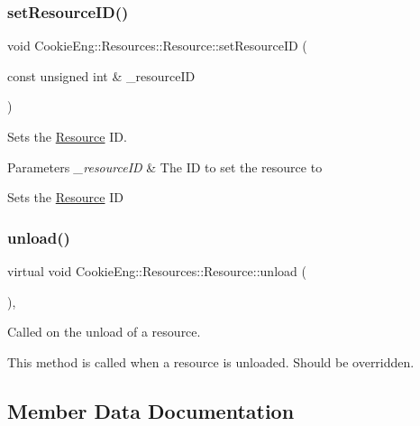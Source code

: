 \subsubsection{\texorpdfstring{set\+Resource\+I\+D()}{setResourceID()}}
{\footnotesize\ttfamily void Cookie\+Eng\+::\+Resources\+::\+Resource\+::set\+Resource\+ID (\begin{DoxyParamCaption}\item[{const unsigned int \&}]{\+\_\+resource\+ID }\end{DoxyParamCaption})\hspace{0.3cm}{\ttfamily [inline]}}



Sets the \hyperlink{class_cookie_eng_1_1_resources_1_1_resource}{Resource} ID. 


\begin{DoxyParams}{Parameters}
{\em \+\_\+resource\+ID} & The ID to set the resource to\\
\hline
\end{DoxyParams}
Sets the \hyperlink{class_cookie_eng_1_1_resources_1_1_resource}{Resource} ID \mbox{\label{class_cookie_eng_1_1_resources_1_1_resource_acfe5141c546d7f3f3e08435b3a21b09c}} 
\subsubsection{\texorpdfstring{unload()}{unload()}}
{\footnotesize\ttfamily virtual void Cookie\+Eng\+::\+Resources\+::\+Resource\+::unload (\begin{DoxyParamCaption}{ }\end{DoxyParamCaption})\hspace{0.3cm}{\ttfamily [inline]}, {\ttfamily [virtual]}}



Called on the unload of a resource. 

This method is called when a resource is unloaded. Should be overridden. 

\subsection{Member Data Documentation}
\mbox{\label{class_cookie_eng_1_1_resources_1_1_resource_aa7b58e5677b621033ac46b8577b8f48e}} 
